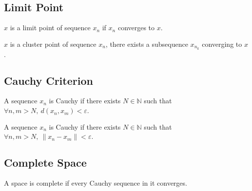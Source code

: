 \subsection{Limit Point}
\begin{definition}
	$x$ is a limit point of sequence $x_n$ if $x_n$ converges to $x$.
\end{definition}

\begin{definition}
	$x$ is a cluster point of sequence $x_n$, there exists a subsequence $x_{n_k}$ converging to $x$.
\end{definition}

\subsection{Cauchy Criterion}
\begin{definition}[metric]
	A sequence $x_n$ is Cauchy if there exists $N \in \mathbb{N}$ such that $\forall n,m > N,\ d(x_n,x_m) < \varepsilon$.
\end{definition}

\begin{definition}[norm]
	A sequence $x_n$ is Cauchy if there exists $N \in \mathbb{N}$ such that $\forall n,m >N,\ \|x_n-x_m\| < \varepsilon$.
\end{definition}

\subsection{Complete Space}
\begin{definition}[complete]
	A space is complete if every Cauchy sequence in it converges.
\end{definition}
